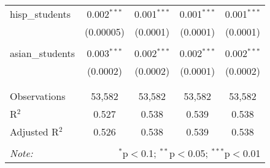 \begin{table}[!htbp]
\begin{tabular}{@{\extracolsep{-2pt}}lcccc}
 hisp\_students & 0.002$^{***}$ & 0.001$^{***}$ & 0.001$^{***}$ & 0.001$^{***}$ \\ 
  & (0.00005) & (0.0001) & (0.0001) & (0.0001) \\ 
  & & & & \\ 
 asian\_students & 0.003$^{***}$ & 0.002$^{***}$ & 0.002$^{***}$ & 0.002$^{***}$ \\ 
  & (0.0002) & (0.0002) & (0.0001) & (0.0002) \\ 
  & & & & \\ 
\hline \\[-1.8ex] 
Observations & 53,582 & 53,582 & 53,582 & 53,582 \\ 
R$^{2}$ & 0.527 & 0.538 & 0.539 & 0.538 \\ 
Adjusted R$^{2}$ & 0.526 & 0.538 & 0.539 & 0.538 \\ 
\hline 
\hline \\[-1.8ex] 
\textit{Note:}  & \multicolumn{4}{r}{$^{*}$p$<$0.1; $^{**}$p$<$0.05; $^{***}$p$<$0.01} \\ 
\end{tabular} 
\end{table} 
